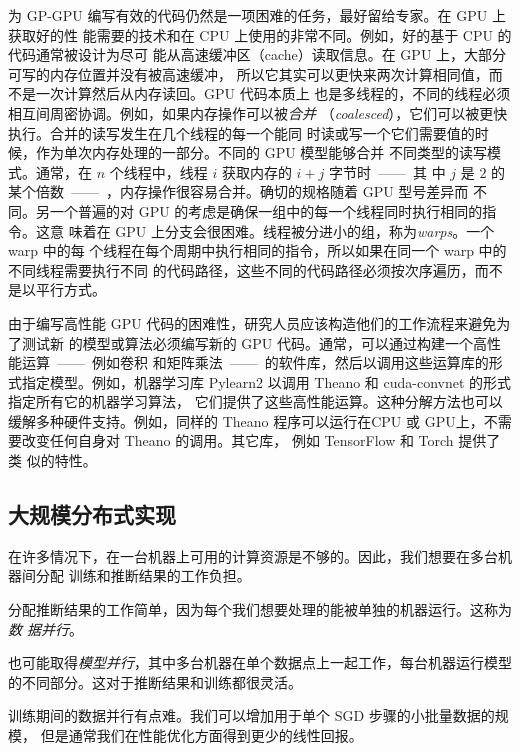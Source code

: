 为 GP-GPU 编写有效的代码仍然是一项困难的任务，最好留给专家。在 GPU 上获取好的性
能需要的技术和在 CPU 上使用的非常不同。例如，好的基于 CPU 的代码通常被设计为尽可
能从高速缓冲区（cache）读取信息。在 GPU 上，大部分可写的内存位置并没有被高速缓冲，
所以它其实可以更快来两次计算相同值，而不是一次计算然后从内存读回。GPU 代码本质上
也是多线程的，不同的线程必须相互间周密协调。例如，如果内存操作可以被\emph{合并}
（\textit{coalesced}），它们可以被更快执行。合并的读写发生在几个线程的每一个能同
时读或写一个它们需要值的时候，作为单次内存处理的一部分。不同的 GPU 模型能够合并
不同类型的读写模式。通常，在 $n$ 个线程中，线程 $i$ 获取内存的 $i + j$ 字节时~——~其
中 $j$ 是 $2$ 的某个倍数~——~，内存操作很容易合并。确切的规格随着 GPU 型号差异而
不同。另一个普遍的对 GPU 的考虑是确保一组中的每一个线程同时执行相同的指令。这意
味着在 GPU 上分支会很困难。线程被分进小的组，称为\emph{warps}。一个 warp 中的每
个线程在每个周期中执行相同的指令，所以如果在同一个 warp 中的不同线程需要执行不同
的代码路径，这些不同的代码路径必须按次序遍历，而不是以平行方式。

由于编写高性能 GPU 代码的困难性，研究人员应该构造他们的工作流程来避免为了测试新
的模型或算法必须编写新的 GPU 代码。通常，可以通过构建一个高性能运算~——~例如卷积
和矩阵乘法~——~的软件库，然后以调用这些运算库的形式指定模型。例如，机器学习库
Pylearn2 \citep{journals/corr/GoodfellowWLDMPBBB13} 以调用 Theano
\citep{bergstra-proc-scipy-2010,DBLP:journals/corr/abs-1211-5590} 和
cuda-convnet \citep{krizhevsky2010convolutional} 的形式指定所有它的机器学习算法，
它们提供了这些高性能运算。这种分解方法也可以缓解多种硬件支持。例如，同样的
Theano 程序可以运行在CPU 或 GPU上，不需要改变任何自身对 Theano 的调用。其它库，
例如 TensorFlow \citep{tensorflow} 和 Torch \citep{collobert2011torch7} 提供了类
似的特性。

\subsection{大规模分布式实现}
\label{subsec:large_scale_distributed_implementations}

在许多情况下，在一台机器上可用的计算资源是不够的。因此，我们想要在多台机器间分配
训练和推断结果的工作负担。

分配推断结果的工作简单，因为每个我们想要处理的能被单独的机器运行。这称为\emph{数
  据并行}。

也可能取得\emph{模型并行}，其中多台机器在单个数据点上一起工作，每台机器运行模型
的不同部分。这对于推断结果和训练都很灵活。

训练期间的数据并行有点难。我们可以增加用于单个 \gls{SGD} 步骤的小批量数据的规模，
但是通常我们在性能优化方面得到更少的线性回报。

